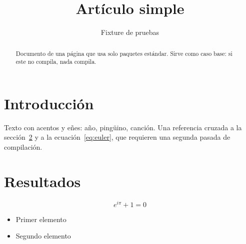 \documentclass[11pt,a4paper]{article}
\title{Artículo simple}
\author{Fixture de pruebas}
\date{}
\begin{document}
\maketitle

\begin{abstract}
Documento de una página que usa solo paquetes estándar. Sirve como caso base:
si este no compila, nada compila.
\end{abstract}

\section{Introducción}\label{sec:intro}
Texto con acentos y eñes: año, pingüino, canción. Una referencia cruzada a la
sección~\ref{sec:resultados} y a la ecuación~\eqref{eq:euler}, que requieren
una segunda pasada de compilación.

\section{Resultados}\label{sec:resultados}
\begin{equation}\label{eq:euler}
  e^{i\pi} + 1 = 0
\end{equation}

\begin{itemize}
  \item Primer elemento
  \item Segundo elemento
\end{itemize}
\end{document}
